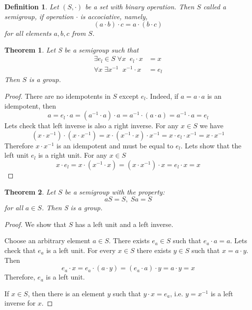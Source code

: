 \documentclass{article}
\newtheorem{definition}{Definition}
\newtheorem{thm}{Theorem}
\begin{document}
\begin{definition}
    Let $(S, \cdot)$ be a set with binary operation. 
    Then $S$ called a semigroup, if operation $\cdot$ is accociative, namely,
    \[
        (a\cdot b)\cdot c= a\cdot (b\cdot c)
        \] 
    for all elements $a, b, c$ from $S$.
\end{definition}

\begin{thm}
    Let S be a semigroup such that
    \begin{align}
        \exists e_l\in S\;\forall x\;\; e_l\cdot x &= x\\
        \forall x\;\exists x^{-1}\;\; x^{-1}\cdot x &= e_l 
    \end{align}
    Then $S$ is a group.
\end{thm}
\begin{proof}
There are no idempotents in $S$ except $e_l$. Indeed, if $a=a\cdot a$ is an 
idempotent, then
\[
a = e_l\cdot a = (a^{-1}\cdot a)\cdot a = 
a^{-1}\cdot(a\cdot a) = a^{-1}\cdot a = e_l
\]
Lets check that left inverse is also a right inverse. For any $x\in S$ we have
\[
    (x\cdot x^{-1})\cdot (x\cdot x^{-1}) = x\cdot(x^{-1}\cdot x)\cdot x^{-1} =
    x\cdot e_l\cdot x^{-1} = x\cdot x^{-1}
\]
Therefore $x\cdot x^{-1}$ is an idempotent and must be equal to $e_l$.
Lets show that the left unit $e_l$ is a right unit. For any $x\in S$
\[
    x\cdot e_l = x\cdot(x^{-1}\cdot x) = (x\cdot x^{-1})\cdot x = 
    e_l\cdot x = x
\]
\end{proof}

\begin{thm}
    Let $S$ be a semigroup with the property:
    \[
        aS = S,\;Sa=S    
    \]
    for all $a\in S$. Then S is a group.
\end{thm}
\begin{proof}
    We show that $S$ has a left unit and a left inverse.

    Choose an arbitrary element $a\in S$. There exists $e_a\in S$ such that $e_a\cdot a = a$.
    Lets check that $e_a$ is a left unit. For every $x\in S$ there exists 
    $y\in S$ such that $x = a\cdot y$. Then
    \[
        e_a\cdot x = e_a\cdot(a\cdot y) = (e_a\cdot a)\cdot y=a\cdot y=x
        \]
    Therefore, $e_a$ is a left unit.

    If $x\in S$, then there is an element $y$ such that $y\cdot x=e_a$, i.e. $y=x^{-1}$
    is a left inverse for $x$.
\end{proof}
\end{document}
